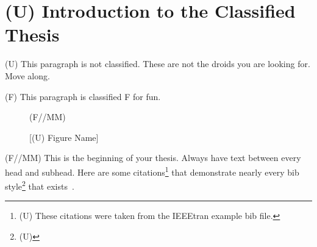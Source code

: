 %

\chapter{(U) Introduction to the Classified Thesis}

(U) This paragraph is not classified. These are not the droids you are
looking for. Move along. 

(F) This paragraph is classified F for fun.

\begin{figure}[h]
\begin{smarkenv}{(F//MM)}
\framebox[\textwidth]{\parbox{\textwidth}{\lipsum[1]}} %
\end{smarkenv}
\caption{[(U) Figure Name]}
\end{figure}

(F//MM) This is the beginning of your thesis. Always have text between every head
and subhead. Here are some citations\footnote{(U) These citations were taken
from the IEEEtran example bib file.} that demonstrate nearly every bib 
style\footnote{(U) \lipsum[10]} that exists~\cite{IEEEhowto:IEEEtranpage,IEEEexample:shellCTANpage,
IEEEexample:IEEEwebsite,IEEEexample:bibtexuser,IEEEexample:bibtexdesign,
IEEEexample:tamethebeast,IEEEexample:bibtexguide,
IEEEexample:article_typical,IEEEexample:articleetal,IEEEexample:conf_typical,
IEEEexample:book_typical,IEEEexample:articlelargepages,
IEEEexample:articledualmonths,IEEEexample:TBPmisc,IEEEexample:TBParticle,
IEEEexample:bookwitheditor,IEEEexample:book,IEEEexample:bookwithseriesvolume,
IEEEexample:inbook,IEEEexample:inbookpagesnote,IEEEexample:incollection,
IEEEexample:incollectionwithseries,IEEEexample:incollection_chpp,
IEEEexample:incollectionmanyauthors,
IEEEexample:motmanualhowpub,IEEEexample:confwithadddays,
IEEEexample:confwithvolume,IEEEexample:confwithpaper,
IEEEexample:confwithpapertype,IEEEexample:presentedatconf,
IEEEexample:masters,IEEEexample:masterstype,IEEEexample:phdurl,
IEEEexample:techrep,IEEEexample:techreptype,IEEEexample:techreptypeii,
IEEEexample:techrepstdsub,IEEEexample:unpublished,IEEEexample:electronhowinfo,
IEEEexample:electronhowinfo2,IEEEexample:electronorgadd,IEEEexample:uspat,
IEEEexample:jppat,IEEEexample:frenchpatreq,IEEEexample:periodical,
IEEEexample:standard,IEEEexample:standardproposed,IEEEexample:draftasmisc,
IEEEexample:miscforum,IEEEexample:whitepaper,IEEEexample:datasheet,
IEEEexample:private,IEEEexample:miscrfc,IEEEexample:softmanual,
IEEEexample:softonline,IEEEexample:miscgermanreg,IEEEexample:bluebookstandard
}.


